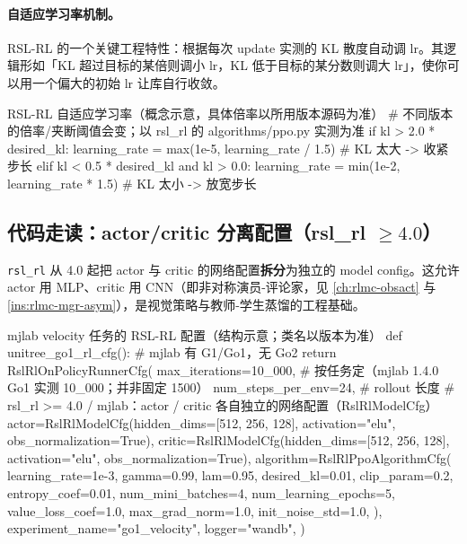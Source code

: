 \paragraph{自适应学习率机制。}RSL-RL 的一个关键工程特性：根据每次 update 实测的 KL 散度自动调 lr。其逻辑形如「KL 超过目标的某倍则调小 lr，KL 低于目标的某分数则调大 lr」，使你可以用一个偏大的初始 lr 让库自行收敛。

\begin{codebox}[Python]{RSL-RL 自适应学习率（概念示意，具体倍率以所用版本源码为准）}
# 不同版本的倍率/夹断阈值会变；以 rsl_rl 的 algorithms/ppo.py 实测为准
if kl > 2.0 * desired_kl:
    learning_rate = max(1e-5, learning_rate / 1.5)   # KL 太大 -> 收紧步长
elif kl < 0.5 * desired_kl and kl > 0.0:
    learning_rate = min(1e-2, learning_rate * 1.5)   # KL 太小 -> 放宽步长
\end{codebox}


\subsection{\texorpdfstring{代码走读：actor/critic 分离配置（rsl\_rl $\ge 4.0$）}{代码走读：actor/critic 分离配置（rsl\_rl >= 4.0）}}

\verb|rsl_rl| 从 4.0 起把 actor 与 critic 的网络配置\textbf{拆分}为独立的 model config。这允许 actor 用 MLP、critic 用 CNN（即非对称演员-评论家，见 \cref{ch:rlmc-obsact} 与 \cref{ins:rlmc-mgr-asym}），是视觉策略与教师-学生蒸馏的工程基础。

\begin{codebox}[Python]{mjlab velocity 任务的 RSL-RL 配置（结构示意；类名以版本为准）}
def unitree_go1_rl_cfg():                        # mjlab 有 G1/Go1，无 Go2
    return RslRlOnPolicyRunnerCfg(
        max_iterations=10_000,                  # 按任务定（mjlab 1.4.0 Go1 实测 10_000；并非固定 1500）
        num_steps_per_env=24,                   # rollout 长度
        # rsl_rl >= 4.0 / mjlab：actor / critic 各自独立的网络配置（RslRlModelCfg）
        actor=RslRlModelCfg(hidden_dims=[512, 256, 128], activation="elu",
                            obs_normalization=True),
        critic=RslRlModelCfg(hidden_dims=[512, 256, 128], activation="elu",
                             obs_normalization=True),
        algorithm=RslRlPpoAlgorithmCfg(
            learning_rate=1e-3, gamma=0.99, lam=0.95, desired_kl=0.01,
            clip_param=0.2, entropy_coef=0.01,
            num_mini_batches=4, num_learning_epochs=5,
            value_loss_coef=1.0, max_grad_norm=1.0, init_noise_std=1.0,
        ),
        experiment_name="go1_velocity", logger="wandb",
    )
\end{codebox}

